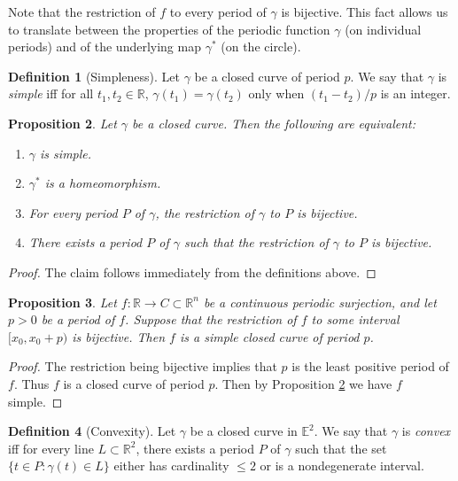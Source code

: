 \documentclass{amsart}
\newtheorem{proposition}{Proposition}[section]
\theoremstyle{definition}
\newtheorem{definition}[proposition]{Definition}
\theoremstyle{remark}
\begin{document}
Note that the restriction of $f$ to every period of $\gamma$ is bijective. This fact allows us to translate between
the properties of the periodic function $\gamma$
(on individual periods) and of the underlying map $\gamma^*$
(on the circle).

\begin{definition}[Simpleness]
    \label{def:simpleness}
    Let $\gamma$ be a closed curve of period $p$.
    We say that $\gamma$ is \emph{simple}
    iff for all $t_1,t_2\in\mathbb{R}$, $\gamma(t_1)=\gamma(t_2)$
    only when $(t_1-t_2)/p$ is an integer.
\end{definition}

\begin{proposition}
    \label{pro:simple_equiv}
    Let $\gamma$ be a closed curve.
    Then the following are equivalent:
    \begin{enumerate}
        \item $\gamma$ is simple.
        \item $\gamma^*$ is a homeomorphism.
        \item For every period $P$ of $\gamma$, the restriction
              of $\gamma$ to $P$ is bijective.
        \item There exists a period $P$ of $\gamma$ such that
              the restriction of $\gamma$ to $P$ is bijective.
    \end{enumerate}
\end{proposition}

\begin{proof}
    The claim follows immediately from the definitions above.
\end{proof}

\begin{proposition}
    \label{pro:simple_suf_cond}
    Let $f:\mathbb{R}\to C\subset\mathbb{R}^n$
    be a continuous periodic surjection,
    and let $p>0$ be a period of $f$. Suppose that
    the restriction of $f$ to some interval $[x_0,x_0+p)$
    is bijective.
    Then $f$ is a simple closed curve of period $p$.
\end{proposition}

\begin{proof}
    The restriction being bijective implies that $p$ is
    the least positive period of $f$. Thus $f$ is a 
    closed curve of period $p$. Then by Proposition
    \ref{pro:simple_equiv} we have $f$ simple.
\end{proof}

\begin{definition}[Convexity]
    Let $\gamma$ be a closed curve in $\mathbb{E}^2$.
    We say that $\gamma$ is \emph{convex} iff
    for every line $L\subset\mathbb{R}^2$,
    there exists a period $P$ of $\gamma$ such that
    the set $\{t\in P:\gamma(t)\in L\}$ either
    has cardinality $\le2$ or is a nondegenerate interval.
\end{definition}
\end{document}
